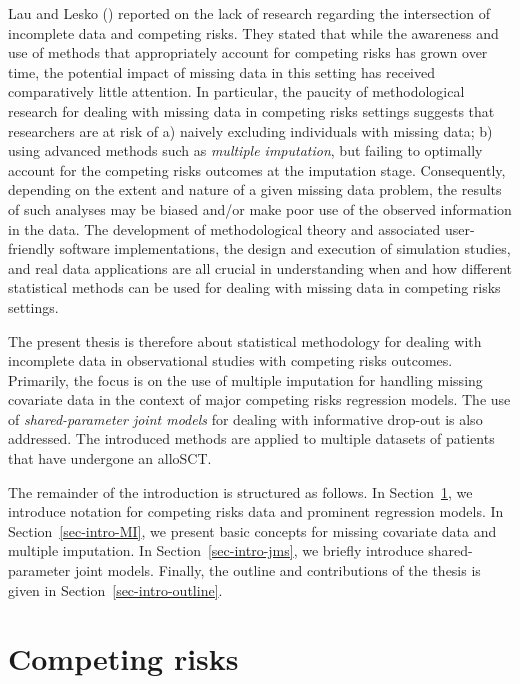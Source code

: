 \documentclass[
  letterpaper,
  paper=240mm:170mm,
  twoside=true,
  open=right,
  fontsize=10pt,
  pagesize=false,
  BCOR=15mm,
  DIV=14,
  headinclude=true,
  footinclude=false,
  headsepline=on]{scrbook}
\begin{document}
Lau and Lesko ()
reported on the lack of research regarding the intersection of
incomplete data and competing risks. They stated that while the
awareness and use of methods that appropriately account for competing
risks has grown over time, the potential impact of missing data in this
setting has received comparatively little attention. In particular, the
paucity of methodological research for dealing with missing data in
competing risks settings suggests that researchers are at risk of a)
naively excluding individuals with missing data; b) using advanced
methods such as \emph{multiple imputation}, but failing to optimally
account for the competing risks outcomes at the imputation stage.
Consequently, depending on the extent and nature of a given missing data
problem, the results of such analyses may be biased and/or make poor use
of the observed information in the data. The development of
methodological theory and associated user-friendly software
implementations, the design and execution of simulation studies, and
real data applications are all crucial in understanding when and how
different statistical methods can be used for dealing with missing data
in competing risks settings.

The present thesis is therefore about statistical methodology for
dealing with incomplete data in observational studies with competing
risks outcomes. Primarily, the focus is on the use of multiple
imputation for handling missing covariate data in the context of major
competing risks regression models. The use of \emph{shared-parameter
joint models} for dealing with informative drop-out is also addressed.
The introduced methods are applied to multiple datasets of patients that
have undergone an alloSCT.

The remainder of the introduction is structured as follows. In
Section~\ref{sec-intro-comp-risks}, we introduce notation for competing
risks data and prominent regression models. In
Section~\ref{sec-intro-MI}, we present basic concepts for missing
covariate data and multiple imputation. In Section~\ref{sec-intro-jms},
we briefly introduce shared-parameter joint models. Finally, the outline
and contributions of the thesis is given in
Section~\ref{sec-intro-outline}.

\section{Competing risks}\label{sec-intro-comp-risks}
\end{document}
